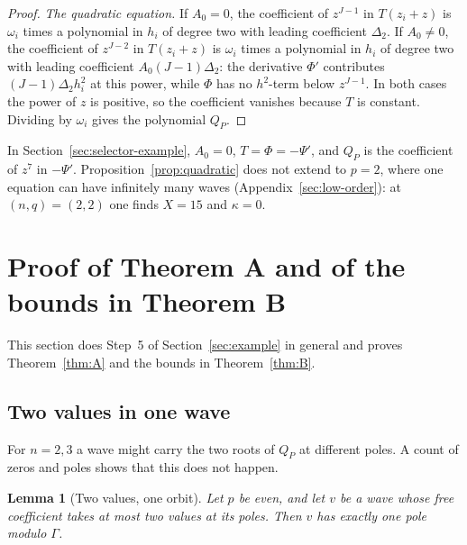 \documentclass[11pt]{article}
\newtheorem{lemma}[theorem]{Lemma}
\theoremstyle{definition}
\theoremstyle{remark}
\numberwithin{equation}{section}
\begin{document}
\begin{proof}
\emph{The quadratic equation.} If \(A_0=0\), the coefficient of
\(z^{J-1}\) in \(T(z_i+z)\) is \(\omega_i\) times a polynomial in
\(h_i\) of degree two with leading coefficient \(\Delta_2\). If
\(A_0\ne0\), the coefficient of \(z^{J-2}\) in \(T(z_i+z)\) is
\(\omega_i\) times a polynomial in \(h_i\) of degree two with leading
coefficient \(A_0(J-1)\Delta_2\): the derivative \(\Phi'\) contributes
\((J-1)\Delta_2h_i^2\) at this power, while \(\Phi\) has no
\(h^2\)-term below \(z^{J-1}\). In both cases the power of \(z\) is
positive, so the coefficient vanishes because \(T\) is constant.
Dividing by \(\omega_i\) gives the polynomial \(Q_P\).
\end{proof}


In Section~\ref{sec:selector-example}, \(A_0=0\),
\(T=\Phi=-\Psi'\), and \(Q_P\) is the coefficient of \(z^7\) in
\(-\Psi'\). Proposition~\ref{prop:quadratic} does not extend to
\(p=2\), where one equation can have infinitely many waves
(Appendix~\ref{sec:low-order}): at \((n,q)=(2,2)\) one finds \(X=15\)
and \(\kappa=0\).

\section{Proof of Theorem A and of the bounds in Theorem B}\label{sec:proof}

This section does Step~5 of Section~\ref{sec:example} in general and
proves Theorem~\ref{thm:A} and the bounds in Theorem~\ref{thm:B}.

\subsection{Two values in one wave}\label{sec:two-germs}

For \(n=2,3\) a wave might carry
the two roots of \(Q_P\) at different poles. A count of zeros and poles
shows that this does not happen.

\begin{lemma}[Two values, one orbit]\label{lem:two-germs}
Let \(p\) be even, and let \(v\) be a wave whose free coefficient takes
at most two values at its poles. Then \(v\) has exactly one pole modulo
\(\Gamma\).
\end{lemma}
\end{document}
